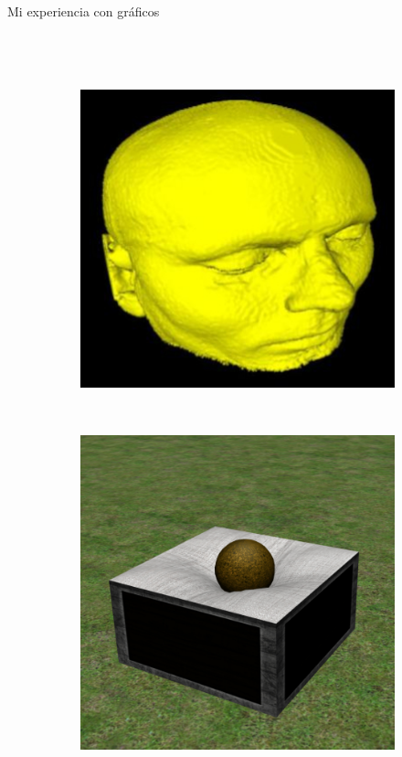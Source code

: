 \begin{frame}{Mi experiencia con gráficos}
\begin{columns}
\begin{figure}[htp]
\begin{subfigure}[b]{0.4\textwidth}
 \end{subfigure}
\\
 \begin{subfigure}[b]{0.4\textwidth}
   \includegraphics[width=\textwidth]{img/master}
 \end{subfigure}
~
\begin{subfigure}[b]{0.4\textwidth}
   \includegraphics[width=\textwidth]{img/bachelor_thesis}
 \end{subfigure}
 
\end{figure}
\end{columns}
\end{frame}